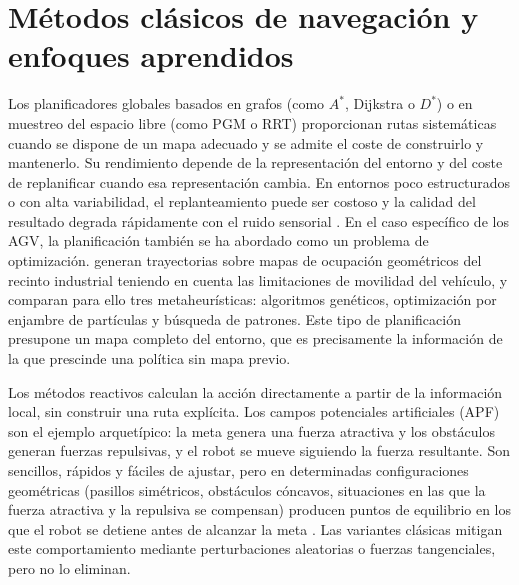 \section{Métodos clásicos de navegación y enfoques aprendidos}
Los planificadores globales basados en grafos (como $A^*$, Dijkstra o $D^*$)
o en muestreo del espacio libre (como PGM o RRT) proporcionan rutas
sistemáticas cuando se dispone de un mapa adecuado y se admite el coste de
construirlo y mantenerlo. Su rendimiento depende de la representación del
entorno y del coste de replanificar cuando esa representación cambia. En
entornos poco estructurados o con alta variabilidad, el replanteamiento
puede ser costoso y la calidad del resultado degrada rápidamente con el
ruido sensorial \citep{sivashangaran2023deep}. En el caso específico de
los AGV, la planificación también se ha abordado como un problema de
optimización. \citet{bayona2024comparative} generan trayectorias sobre
mapas de ocupación geométricos del recinto industrial teniendo en cuenta
las limitaciones de movilidad del vehículo, y comparan para ello tres
metaheurísticas: algoritmos genéticos, optimización por enjambre de
partículas y búsqueda de patrones. Este tipo de planificación presupone
un mapa completo del entorno, que es precisamente la información de la
que prescinde una política sin mapa previo.

Los métodos reactivos calculan la acción directamente a partir de la
información local, sin construir una ruta explícita. Los campos
potenciales artificiales (APF) son el ejemplo arquetípico: la meta genera
una fuerza atractiva y los obstáculos generan fuerzas repulsivas, y el
robot se mueve siguiendo la fuerza resultante. Son sencillos, rápidos y
fáciles de ajustar, pero en determinadas configuraciones geométricas
(pasillos simétricos, obstáculos cóncavos, situaciones en las que la fuerza
atractiva y la repulsiva se compensan) producen puntos de equilibrio en los
que el robot se detiene antes de alcanzar la meta
\citep{perez2022navigation}. Las variantes clásicas mitigan este
comportamiento mediante perturbaciones aleatorias o fuerzas tangenciales,
pero no lo eliminan.

